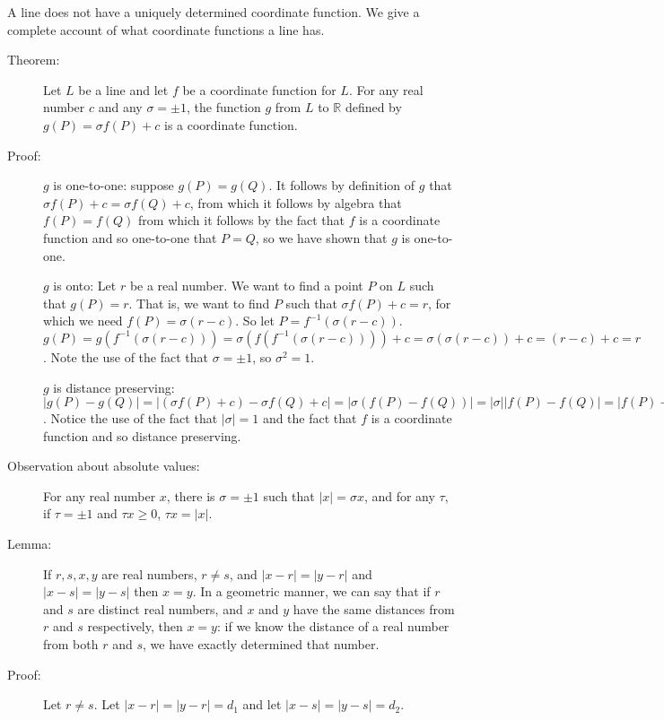 \documentclass[12pt]{article}
\begin{document}
A line does not have a uniquely determined coordinate function.  We give a complete account of what coordinate functions a line has.

\begin{description}



\item [Theorem:]  Let $L$ be a line and let $f$ be a coordinate function for $L$.  For any real number $c$ and any $\sigma = \pm 1$, the function $g$ from $L$ to $\mathbb R$ defined by $g(P) = \sigma f(P) + c$ is a coordinate function.

\item[Proof:]  $g$ is one-to-one:  suppose $g(P) = g(Q)$.  It follows by definition of $g$ that $\sigma f(P) + c = \sigma f(Q) + c$, from which it follows by algebra that $f(P) = f(Q)$ from which it follows by the fact that $f$ is a coordinate function and so one-to-one that $P=Q$, so we have shown that $g$ is one-to-one.

$g$ is onto:  Let $r$ be a real number.  We want to find a point $P$ on $L$ such that $g(P)=r$.  That is, we want to find $P$ such that $\sigma f(P) + c = r$, for which we need $f(P) = \sigma(r-c)$.  So let $P = f^{-1}(\sigma(r-c))$.  $g(P) = g(f^{-1}(\sigma(r-c))) = \sigma(f(f^{-1}(\sigma(r-c))))+ c = \sigma(\sigma(r-c)) + c = (r-c)+c = r$.  Note the use of the fact that $\sigma=\pm 1$, so $\sigma^2=1$.

$g$ is distance preserving:  $|g(P)-g(Q)| = |(\sigma f(P) + c) - \sigma f(Q) +c| = |\sigma(f(P) - f(Q))| = |\sigma||f(P)-f(Q)| = |f(P)-f(Q)| = d(P,Q)$.  Notice the use of the fact that $|\sigma|=1$ and the fact that $f$ is a coordinate function and so distance preserving.

\item[Observation about absolute values:]  For any real number $x$, there is $\sigma = \pm 1$ such that $|x| = \sigma x$, and for any $\tau$,  if $\tau = \pm1$ and $\tau x \geq 0$, $\tau x = |x|$.

\item[Lemma:]  If $r,s,x,y$ are real numbers, $r \neq s$,  and $|x-r|=|y-r|$ and $|x-s| = |y-s|$ then $x=y$.  In a geometric manner, we can say that if $r$ and $s$ are distinct real numbers, and $x$ and $y$ have the same distances from $r$ and $s$ respectively, then $x=y$:  if we know the distance of a real number from both $r$ and $s$, we have exactly determined that number.

\item[Proof:]  Let $r \neq s$.  Let $|x-r|=|y-r| = d_1$ and let $|x-s|=|y-s|=d_2$.


\end{description}
\end{document}
